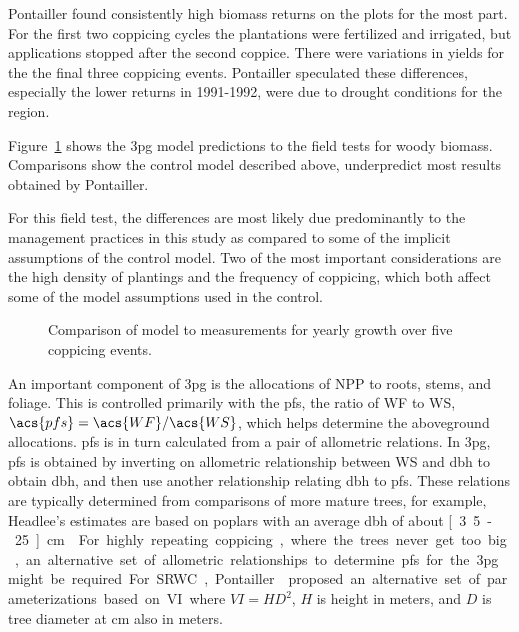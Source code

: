 \documentclass[10pt]{article}
\begin{document}
Pontailler found consistently high biomass returns on the plots for the most
part.  For the first two coppicing cycles the plantations were fertilized and
irrigated, but applications stopped after the second coppice.  There were
variations in yields for the the final three coppicing events.  Pontailler
speculated these differences, especially the lower returns in 1991-1992, were
due to drought conditions for the region.

Figure~\ref{fig:pont-biomass} shows the \ac{3pg} model predictions to the field
tests for woody biomass.  Comparisons show the control model described above,
underpredict most results obtained by Pontailler.  

For this field test, the differences are most likely due predominantly to the
management practices in this study as compared to some of the implicit
assumptions of the control model.  Two of the most important considerations are
the high density of plantings and the frequency of coppicing, which both affect
some of the model assumptions used in the control.

\begin{figure}[!ht]
  \centering
  
  \caption{Comparison of model to measurements for yearly growth over five
    coppicing events.}
\label{fig:pont-biomass}
\end{figure}

An important component of \ac{3pg} is the allocations of \ac{NPP} to roots,
stems, and foliage.  This is controlled primarily with the \ac{pfs}, the ratio of
\ac{WF} to \ac{WS}, $\acs{pfs}=\acs{WF}/\acs{WS}$, which helps determine the
aboveground allocations.  \ac{pfs} is in turn calculated from a pair of
allometric relations.  In \ac{3pg}, \ac{pfs} is obtained by inverting on
allometric relationship between \ac{WS} and \ac{dbh} to obtain \ac{dbh}, and then
use another relationship relating \ac{dbh} to \ac{pfs}.  These relations are
typically determined from comparisons of more mature trees, for example,
Headlee's estimates are based on poplars with an average \ac{dbh} of about
\unit[3.5~-~25]{cm}~\cite{Headlee2012,Fortier2010}.

For highly repeating coppicing, where the trees never get too big, an
alternative set of allometric relationships to determine \ac{pfs} for the
\acs{3pg} might be required.  For \ac{SRWC},
Pontailler~\cite{pontailler97-volume-index} proposed an alternative set of
parameterizations based on \acf{VI} where $VI = HD^2$, $H$ is height in meters,
and $D$ is tree diameter at \unit[22]{cm} also in meters.
\end{document}
